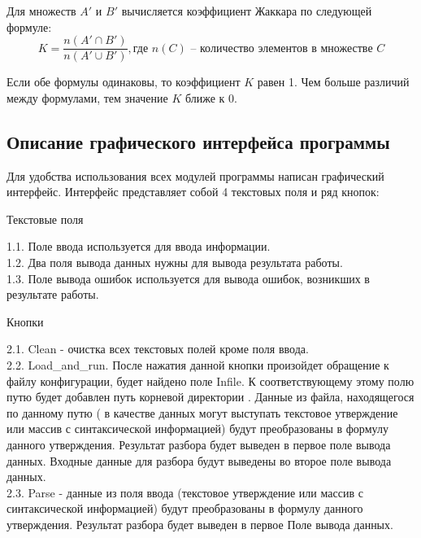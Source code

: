 \documentclass[12pt]{article}
\begin{document}
Для множеств $A'$ и $B'$ вычисляется коэффициент Жаккара по следующей формуле: $$K=\dfrac{n(A' \cap B')}{n(A' \cup B')}, \text{где } n(C) \text{ --  количество элементов в множестве } C$$

Если обе формулы одинаковы, то коэффициент $K$ равен 1. Чем больше различий между формулами, тем значение $K$ ближе к  $0$.\\

\subsection{Описание графического интерфейса программы}
Для удобства использования всех модулей программы написан графический интерфейс. Интерфейс представляет собой 4 текстовых поля и ряд кнопок:

\begin{center} Текстовые поля \end{center}

1.1. Поле ввода используется для ввода информации. \\

1.2. Два поля вывода данных нужны для вывода результата работы.\\

1.3. Поле вывода ошибок  используется для вывода ошибок, возникших в результате работы.

\begin{center} Кнопки \end{center}

2.1. Clean - очистка всех текстовых полей кроме поля ввода.\\

2.2. Load\_and\_run. После нажатия данной кнопки произойдет обращение к файлу конфигурации, будет найдено поле Infile. К соответствующему этому полю путю будет добавлен путь корневой директории .
Данные из  файла, находящегося по данному путю ( в качестве данных могут выступать текстовое утверждение или массив с синтаксической информацией) будут преобразованы в формулу данного утверждения.
 Результат разбора будет выведен в первое поле вывода данных. Входные данные для разбора будут выведены во второе поле вывода данных. \\

2.3. Parse - данные из поля ввода (текстовое утверждение или массив с синтаксической информацией) будут преобразованы в формулу данного утверждения. Результат разбора будет выведен в первое Поле вывода данных.\\	
\end{document}
